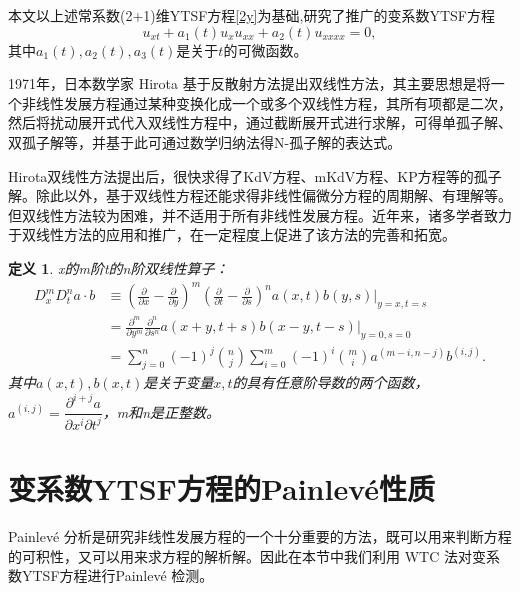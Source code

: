 \documentclass[11pt,a4paper]{ctexart}
\newtheorem{definition}{定义}[section]
\begin{document}
本文以上述常系数(2+1)维YTSF方程\eqref{2y}为基础,研究了推广的变系数YTSF方程
\begin{equation}
    u_{xt}+a_1(t)u_xu_{xx}+a_2(t)u_{xxxx}=0,
\end{equation}
其中$a_1(t),a_2(t),a_3(t)$是关于$t$的可微函数。


1971年，日本数学家 Hirota 基于反散射方法提出双线性方法，其主要思想是将一个非线性发展方程通过某种变换化成一个或多个双线性方程，其所有项都是二次，然后将扰动展开式代入双线性方程中，通过截断展开式进行求解，可得单孤子解、双孤子解等，并基于此可通过数学归纳法得N-孤子解的表达式。

Hirota双线性方法提出后，很快求得了KdV方程、mKdV方程、KP方程等的孤子解。除此以外，基于双线性方程还能求得非线性偏微分方程的周期解、有理解等。但双线性方法较为困难，并不适用于所有非线性发展方程。近年来，诸多学者致力于双线性方法的应用和推广，在一定程度上促进了该方法的完善和拓宽。

\begin{definition}\label{d1}
    x的m阶t的n阶双线性算子{\rm \cite{pzl1998}}：
    \begin{align*}
        D_x^mD_t^na \cdot b & \equiv (\frac{\partial}{\partial x}-\frac{\partial}{\partial y})^m(\frac{\partial}{\partial t}-\frac{\partial}{\partial s})^n a(x,t)b(y,s)\bigg|_{y=x,t=s} \\
                            & =\frac{\partial^m}{\partial y^m}\frac{\partial^n}{\partial s^n}a(x+y,t+s)b(x-y,t-s)\bigg|_{y=0,s=0}                                                        \\
                            & =\sum_{j=0}^{n}(-1)^j{ n \choose j }\sum_{i=0}^{m}(-1)^i{ m \choose i }a^{(m-i,n-j)}b^{(i,j)}.
    \end{align*}
    其中$a(x,t),b(x,t)$是关于变量$x,t$的具有任意阶导数的两个函数，$a^{(i,j)}=\dfrac{\partial^{i+j} a}{\partial x^i\partial t^j}$，m和n是正整数。
\end{definition}


\section{变系数YTSF方程的Painlev\'{e}性质}
Painlev\'{e} 分析是研究非线性发展方程的一个十分重要的方法，既可以用来判断方程的可积性，又可以用来求方程的解析解。因此在本节中我们利用 WTC 法对变系数YTSF方程进行Painlev\'{e} 检测。
\end{document}
